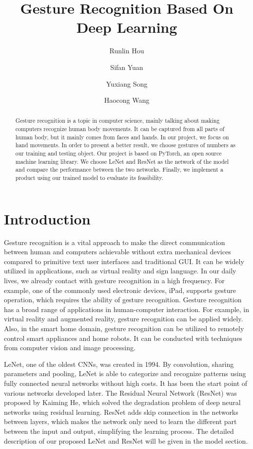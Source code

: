 \documentclass[12pt]{article}
\begin{document}
\title{\textbf{Gesture Recognition Based On Deep Learning}}
\author{Runlin Hou \and Sifan Yuan \and Yuxiang Song \and Haocong Wang}
\maketitle

\begin{abstract}
Gesture recognition is a topic in computer science, mainly talking about making computers recognize human body movements. It can be captured from all parts of human body, but it mainly comes from faces and hands. In our project, we focus on hand movements. In order to present a better result, we choose gestures of numbers as our training and testing object. Our project is based on PyTorch, an open source machine learning library. We choose LeNet and ResNet as the network of the model and compare the performance between the two networks. Finally, we implement a product using our trained model to evaluate its feasibility.
\end{abstract}

\section{Introduction}
Gesture recognition is a vital approach to make the direct communication between human and computers achievable without extra mechanical devices compared to primitive text user interfaces and traditional GUI. It can be widely utilized in applications, such as virtual reality and sign language. In our daily lives, we already contact with gesture recognition in a high frequency. For example, one of the commonly used electronic devices, iPad, supports gesture operation, which requires the ability of gesture recognition. Gesture recognition has a broad range of applications in human-computer interaction. For example, in virtual reality and augmented reality, gesture recognition can be applied widely. Also, in the smart home domain, gesture recognition can be utilized to remotely control smart appliances and home robots. It can be conducted with techniques from computer vision and image processing.

LeNet, one of the oldest CNNs, was created in 1994. By convolution, sharing parameters and pooling, LeNet is able to categorize and recognize patterns using fully connected neural networks without high costs. It has been the start point of various networks developed later. The Residual Neural Network (ResNet) was proposed by Kaiming He, which solved the degradation problem of deep neural networks using residual learning. ResNet adds skip connection in the networks between layers, which makes the network only need to learn the different part between the input and output, simplifying the learning process. The detailed description of our proposed LeNet and ResNet will be given in the model section.
\end{document}
